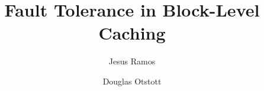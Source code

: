 \documentclass[letterpaper,twocolumn,10pt]{article}
\title{Fault Tolerance in Block-Level Caching}
\author{
  Jesus Ramos \and
  Douglas Otstott
}
\begin{document}
\maketitle

\begin{abstract}
  
\end{abstract}










\end{document}
